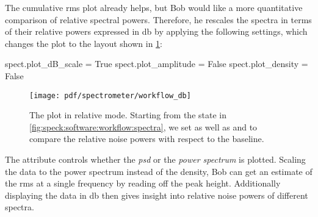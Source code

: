 The cumulative \gls{rms} plot already helps, but Bob would like a more quantitative comparison of relative spectral powers.
Therefore, he rescales the spectra in terms of their relative powers expressed in \unit{\decibel}
by applying the following settings, which changes the plot to the layout shown in \cref{fig:speck:software:workflow:db}:
\begin{py}
    spect.plot_dB_scale = True
    spect.plot_amplitude = False
    spect.plot_density = False
\end{py}
\begin{figure}
    \centering
    \texttt{[image: pdf/spectrometer/workflow\_db]}
    \caption[The \pyspeck plot in relative mode.]{
        The \pyspeck plot in relative mode.
        Starting from the state in \cref{fig:speck:software:workflow:spectra}, we set  as well as  and  to compare the relative noise powers with respect to the baseline.
    }
    \label{fig:speck:software:workflow:db}
\end{figure}
The attribute  controls whether the \emph{\acrlong{psd}} or the \emph{power spectrum} is plotted.
Scaling the data to the power spectrum instead of the density, Bob can get an estimate of the \gls{rms} at a single frequency by reading off the peak height.
Additionally displaying the data in \unit{\decibel} then gives insight into relative noise powers of different spectra.

